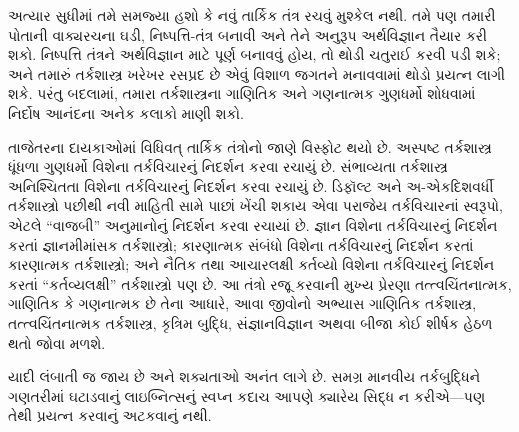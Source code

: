 \begingroup
\makeatletter{}\makeatother


\label{guunit:OLP-0181}


અત્યાર સુધીમાં તમે સમજ્યા હશો કે નવું તાર્કિક તંત્ર રચવું મુશ્કેલ નથી.
તમે પણ તમારી પોતાની વાક્યરચના ઘડી, નિષ્પત્તિ-તંત્ર બનાવી અને તેને
અનુરૂપ અર્થવિજ્ઞાન તૈયાર કરી શકો. નિષ્પત્તિ તંત્રને અર્થવિજ્ઞાન
માટે પૂર્ણ બનાવવું હોય, તો થોડી ચતુરાઈ કરવી પડી શકે; અને તમારું
તર્કશાસ્ત્ર ખરેખર રસપ્રદ છે એવું વિશાળ જગતને મનાવવામાં થોડો પ્રયત્ન
લાગી શકે. પરંતુ બદલામાં, તમારા તર્કશાસ્ત્રના ગાણિતિક અને ગણનાત્મક
ગુણધર્મો શોધવામાં નિર્દોષ આનંદના અનેક કલાકો માણી શકો.

તાજેતરના દાયકાઓમાં વિધિવત્ તાર્કિક તંત્રોનો જાણે વિસ્ફોટ થયો છે.
અસ્પષ્ટ તર્કશાસ્ત્ર ધૂંધળા ગુણધર્મો વિશેના તર્કવિચારનું નિદર્શન કરવા
રચાયું છે. સંભાવ્યતા તર્કશાસ્ત્ર અનિશ્ચિતતા વિશેના તર્કવિચારનું
નિદર્શન કરવા રચાયું છે. ડિફૉલ્ટ અને અ-એકદિશવર્ધી તર્કશાસ્ત્રો પછીથી
નવી માહિતી સામે પાછાં ખેંચી શકાય એવા પરાજેય તર્કવિચારનાં સ્વરૂપો,
એટલે ``વાજબી'' અનુમાનોનું નિદર્શન કરવા રચાયાં છે. જ્ઞાન વિશેના
તર્કવિચારનું નિદર્શન કરતાં જ્ઞાનમીમાંસક તર્કશાસ્ત્રો; કારણાત્મક
સંબંધો વિશેના તર્કવિચારનું નિદર્શન કરતાં કારણાત્મક તર્કશાસ્ત્રો; અને
નૈતિક તથા આચારલક્ષી કર્તવ્યો વિશેના તર્કવિચારનું નિદર્શન કરતાં
``કર્તવ્યલક્ષી'' તર્કશાસ્ત્રો પણ છે. આ તંત્રો રજૂ કરવાની મુખ્ય પ્રેરણા
તત્ત્વચિંતનાત્મક, ગાણિતિક કે ગણનાત્મક છે તેના આધારે, આવા જીવોનો અભ્યાસ
ગાણિતિક તર્કશાસ્ત્ર, તત્ત્વચિંતનાત્મક તર્કશાસ્ત્ર, કૃત્રિમ બુદ્ધિ,
સંજ્ઞાનવિજ્ઞાન અથવા બીજા કોઈ શીર્ષક હેઠળ થતો જોવા મળશે.

યાદી લંબાતી જ જાય છે અને શક્યતાઓ અનંત લાગે છે. સમગ્ર માનવીય
તર્કબુદ્ધિને ગણતરીમાં ઘટાડવાનું લાઇબ્નિત્સનું સ્વપ્ન કદાચ આપણે ક્યારેય
સિદ્ધ ન કરીએ---પણ તેથી પ્રયત્ન કરવાનું અટકવાનું નથી.
\endgroup


\OLEndChapterHook
\endgroup


\OLEndPartHook

